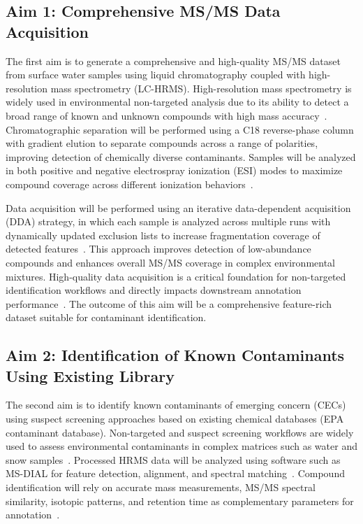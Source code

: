 \documentclass[11pt]{article}
\begin{document}
\begin{doublespace}
    \subsection{Aim 1: Comprehensive MS/MS Data Acquisition}
    The first aim is to generate a comprehensive and high-quality MS/MS dataset from surface water samples using liquid chromatography coupled with high-resolution mass spectrometry (LC-HRMS).
    High-resolution mass spectrometry is widely used in environmental non-targeted analysis due to its ability to detect a broad range of known and unknown compounds with high mass accuracy~\cite{Fisher2022, Hupatz2025}.
    Chromatographic separation will be performed using a C18 reverse-phase column with gradient elution to separate compounds across a range of polarities, improving detection of chemically diverse contaminants. 
    Samples will be analyzed in both positive and negative electrospray ionization (ESI) modes to maximize compound coverage across different ionization behaviors~\cite{Wenkai}.

    Data acquisition will be performed using an iterative data-dependent acquisition (DDA) strategy, in which each sample is analyzed across multiple runs with dynamically updated exclusion lists to increase fragmentation coverage of detected features~\cite{Koelmel2017}.
    This approach improves detection of low-abundance compounds and enhances overall MS/MS coverage in complex environmental mixtures.
    High-quality data acquisition is a critical foundation for non-targeted identification workflows and directly impacts downstream annotation performance~\cite{Schulze2020}.
    The outcome of this aim will be a comprehensive feature-rich dataset suitable for contaminant identification.

    \subsection{Aim 2: Identification of Known Contaminants Using Existing Library}
    The second aim is to identify known contaminants of emerging concern (CECs) using suspect screening approaches based on existing chemical databases (EPA contaminant database).
    Non-targeted and suspect screening workflows are widely used to assess environmental contaminants in complex matrices such as water and snow samples~\cite{Gray2022,NinoSuastegui2025}.
    Processed HRMS data will be analyzed using software such as MS-DIAL for feature detection, alignment, and spectral matching~\cite{Tsugawa2015}.
    Compound identification will rely on accurate mass measurements, MS/MS spectral similarity, isotopic patterns, and retention time as complementary parameters for annotation~\cite{Kind2018}.
    

\end{doublespace}
\end{document}
